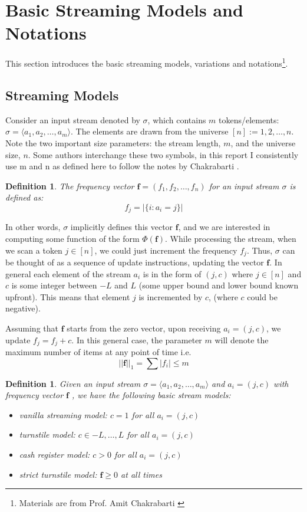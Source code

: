 \documentclass[11pt]{article}
\theoremstyle{plain}
\newtheorem{definition}[theorem]{Definition}
\begin{document}
\section{Basic Streaming Models and Notations}
\label{s:model}

This section introduces the basic streaming models, variations and 
notations\footnote{Materials are from Prof. Amit 
Chakrabarti  \cite{Cha2015-notes}}.

\subsection{Streaming Models}
Consider an input stream denoted by $\sigma$, which contains $m$ 
tokens/elements: $\sigma=\langle a_1, a_2, \dots, a_m\rangle$. The elements 
are drawn from the universe $[n] := {1, 2, \dots, n}$. 
Note the two important size parameters: the stream length, $m$, and the 
universe size, $n$. Some authors interchange these two symbols, in this 
report I consistently use m and n as defined here to follow the notes by 
Chakrabarti  \cite{Cha2015-notes}.

\begin{definition}
	The frequency vector $\textbf{f}=(f_1, f_2, \dots, f_n)$ for an input stream 
	$\sigma$ is defined as: 
	\[
	f_j=|\{i: a_i=j\}|
	\]
\end{definition}
In other words, $\sigma$ implicitly defines this vector $\textbf{f}$, and we 
are interested in computing some function of the form $\Phi(\textbf{f})$. 
While processing the stream, when we scan a token $j \in [n]$, we could just 
increment the frequency $f_j$. Thus, $\sigma$ can be thought of as a 
sequence of update instructions, updating the vector $\textbf{f}$. In general 
each element of the stream $a_i$ is in the form of $(j, c)$ where $j\in [n]$ 
and $c$ is some integer between $-L$ and $L$ (some upper bound and 
lower bound known upfront). This means that element $j$ is incremented by 
$c$, (where $c$ could be negative). 

Assuming that $\textbf{f}$ starts from the zero vector, upon receiving 
$a_i=(j,c)$, we update $f_j=f_j+c$. In this general case, the parameter $m$ 
will denote the maximum number of items at any point
of time i.e. 
\[
||\textbf{f}||_1 = \sum |f_i|\leq m
\]

\begin{definition}
Given an input stream $\sigma=\langle a_1, a_2, \dots, a_m\rangle$ and 
$a_i=(j, c)$ with frequency vector $\textbf{f}$ , we have the following basic 
stream models:
\begin{itemize}
	\item vanilla streaming model: $c=1$ for all $a_i=(j,c)$
	\item turnstile model: $c \in {-L,\dots,L}$ for all $a_i=(j,c)$
	\item cash register model: $c > 0$ for all $a_i=(j,c)$
	\item strict turnstile model: $ \textbf{f} \geq 0$ at all times
\end{itemize}
\end{definition}
\end{document}
